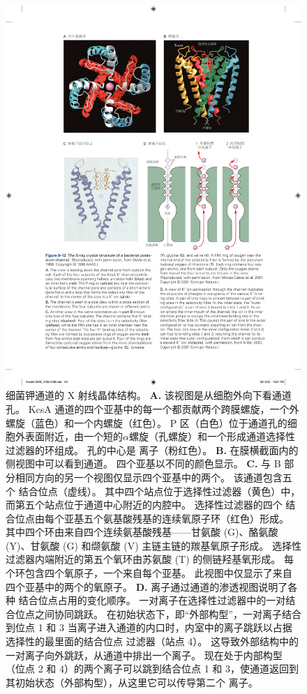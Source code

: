 \begin{figure}[htbp]
	\centering
	\includegraphics[width=0.7\linewidth]{chap08/fig_8_12}
	\caption{细菌钾通道的 X 射线晶体结构\cite{doyle1998structure}。
		\textbf{A.} 该视图是从细胞外向下看通道孔。
		KcsA  通道的四个亚基中的每一个都贡献两个跨膜螺旋，一个外螺旋（蓝色）和一个内螺旋（红色）。
		P 区（白色）位于通道孔的细胞外表面附近，由一个短的$\alpha$螺旋（孔螺旋）和一个形成通道选择性过滤器的环组成。
		孔的中心是  离子（粉红色）。
		\textbf{B.} 在膜横截面内的侧视图中可以看到通道。 四个亚基以不同的颜色显示。
		\textbf{C.} 与 B 部分相同方向的另一个视图仅显示四个亚基中的两个。
		该通道包含五个  结合位点（虚线）。
		其中四个站点位于选择性过滤器（黄色）中，而第五个站点位于通道中心附近的内腔中。
		选择性过滤器的四个  结合位点由每个亚基五个氨基酸残基的连续氧原子环（红色）形成。
		其中四个环由来自四个连续氨基酸残基——甘氨酸 (G)、酪氨酸 (Y)、甘氨酸 (G) 和缬氨酸 (V) 主链主链的羰基氧原子形成。
		选择性过滤器内端附近的第五个氧环由苏氨酸 (T) 的侧链羟基氧形成。
		每个环包含四个氧原子，一个来自每个亚基。
		此视图中仅显示了来自四个亚基中的两个的氧原子\cite{morais2001energetic}。
		\textbf{D.}  离子通过通道的渗透视图说明了各种  结合位点占用的变化顺序。
		一对离子在选择性过滤器中的一对结合位点之间协同跳跃。
		在初始状态下，即“外部构型”，一对离子结合到位点 1 和 3
		当离子进入通道的内口时，内室中的离子跳跃以占据选择性的最里面的结合位点 过滤器（站点 4）。
		这导致外部结构中的一对离子向外跳跃，从通道中排出一个离子。
		现在处于内部构型（位点 2 和 4）的两个离子可以跳到结合位点 1 和 3，使通道返回到其初始状态（外部构型），从这里它可以传导第二个  离子\cite{miller2001see}。}
	\label{fig:8_12}
\end{figure}


